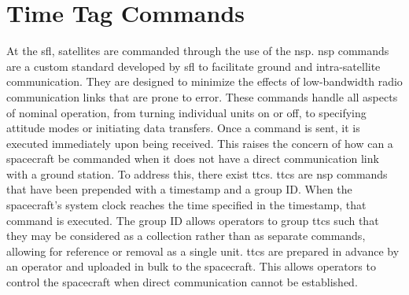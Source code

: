 \section{Time Tag Commands}

At the \gls{sfl}, satellites are commanded through the use of the \gls{nsp}.
\gls{nsp} commands are a custom standard developed by \gls{sfl} to facilitate
ground and intra-satellite communication. They are designed to minimize the
effects of low-bandwidth radio communication links that are prone to error.
These commands handle all aspects of nominal operation, from turning individual
units on or off, to specifying attitude modes or initiating data transfers.
Once a command is sent, it is executed immediately upon being received. This
raises the concern of how can a spacecraft be commanded when it does not have a
direct communication link with a ground station. To address this, there exist
\glspl{ttc}. \glspl{ttc} are \gls{nsp} commands that have been prepended with a
timestamp and a group ID. When the spacecraft’s system clock reaches the time
specified in the timestamp, that command is executed.  The group ID allows
operators to group \glspl{ttc} such that they may be considered as a collection
rather than as separate commands, allowing for reference or removal as a single
unit.  \glspl{ttc} are prepared in advance by an operator and uploaded in bulk
to the spacecraft.  This allows operators to control the spacecraft when direct
communication cannot be established.



